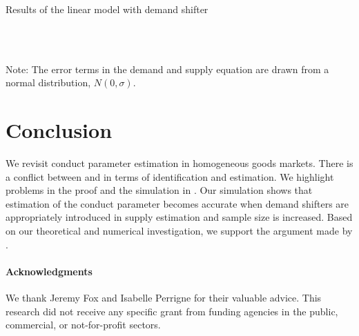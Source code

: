 \documentclass[11pt, a4paper]{article}
\begin{document}
\begin{table}[!htbp]
  \begin{center}
      \caption{Results of the linear model with demand shifter}
      \label{tb:linear_linear_sigma_1} 
      \subfloat[$\sigma=0.001$]{}\\
      \subfloat[$\sigma=0.5$]{}\\
    \subfloat[$\sigma=2.0$]
    {}
  \end{center}
  \footnotesize
  Note: The error terms in the demand and supply equation are drawn from a normal distribution, $N(0,\sigma)$.
\end{table} 



\section{Conclusion}
We revisit conduct parameter estimation in homogeneous goods markets.
There is a conflict between \citet{bresnahan1982oligopoly} and \citet{perloff2012collinearity} in terms of identification and estimation.
We highlight problems in the proof and the simulation in \citet{perloff2012collinearity}.
Our simulation shows that estimation of the conduct parameter becomes accurate when demand shifters are appropriately introduced in supply estimation and sample size is increased. 
Based on our theoretical and numerical investigation, we support the argument made by \citet{bresnahan1982oligopoly}.


\paragraph{Acknowledgments}
We thank Jeremy Fox and Isabelle Perrigne for their valuable advice. This research did not receive any specific grant from funding agencies in the public, commercial, or not-for-profit sectors. 

\newpage





\newpage



\end{document}
